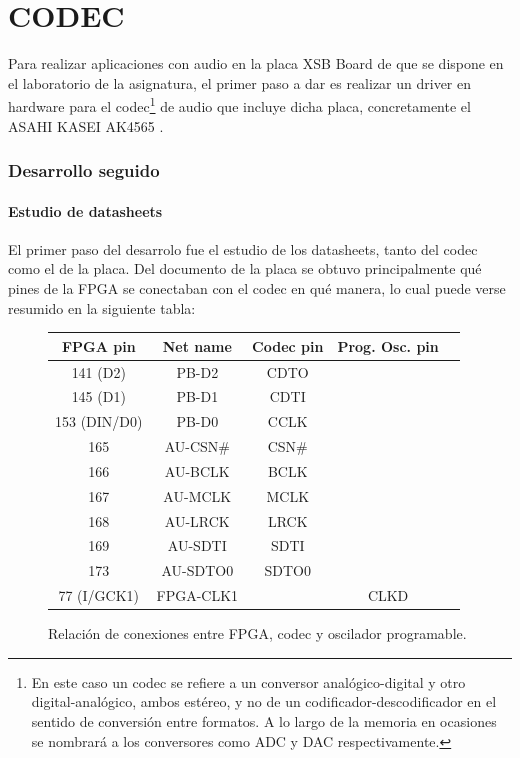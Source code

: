 \part{CODEC}

Para realizar aplicaciones con audio en la placa XSB Board \cite{XSBBoard} de que se dispone en el laboratorio de la asignatura, el primer paso a dar es realizar un driver en hardware para el codec\footnote{En este caso un codec se refiere a un conversor analógico-digital y otro digital-analógico, ambos estéreo, y no de un codificador-descodificador en el sentido de conversión entre formatos. A lo largo de la memoria en ocasiones se nombrará a los conversores como ADC y DAC respectivamente.} de audio que incluye dicha placa, concretamente el ASAHI KASEI AK4565 \cite{AK4565}.

	
	
\section{Desarrollo seguido}

	\subsection{Estudio de datasheets}
		El primer paso del desarrolo fue el estudio de los datasheets, tanto del codec como el de la placa. Del documento de la placa se obtuvo principalmente qué pines de la FPGA se conectaban con el codec en qué manera, lo cual puede verse resumido en la siguiente tabla:


\begin{figure}[H]

\centering
	\begin{tabular}{|c|c|c|c|c|}
		\hline
		\textbf{FPGA pin} & \textbf{Net name} & \textbf{Codec pin} & \textbf{Prog. Osc. pin}\\
		\hline
		141 (D2) & PB-D2 & CDTO &\\
		\hline
		145 (D1) & PB-D1 & CDTI &\\
		\hline
		153 (DIN/D0) & PB-D0 & CCLK &\\
		\hline
		165 & AU-CSN\# & CSN\# &\\
		\hline
		166 &  AU-BCLK & BCLK &\\
		\hline
		167 &  AU-MCLK & MCLK &\\
		\hline
		168 &  AU-LRCK & LRCK &\\
		\hline
		169 &  AU-SDTI & SDTI &\\
		\hline
		173 &  AU-SDTO0 & SDTO0 &\\
		\hline
		77 (I/GCK1) & FPGA-CLK1 & & CLKD\\
		\hline
	\end{tabular}

  \caption{Relación de conexiones entre FPGA, codec y oscilador programable.}
\end{figure}


